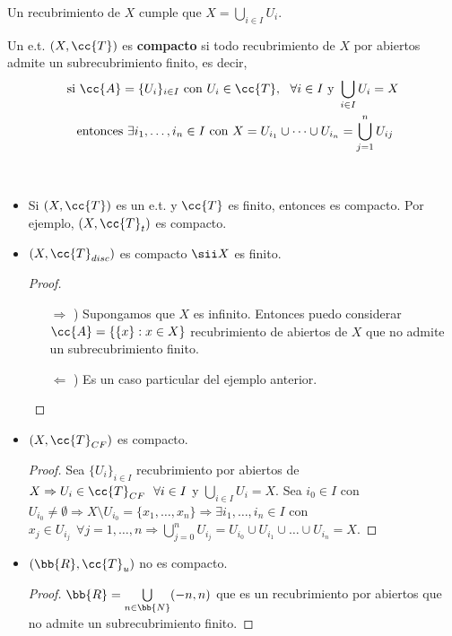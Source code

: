 \begin{observacion}
    Un recubrimiento de $X$ cumple que $X=\bigcup\limits_{i\in I}U_i$.
    \endsquare
\end{observacion}

\begin{definicion}
    Un e.t. $(X, \cc{T})$ es \textbf{compacto} si todo recubrimiento de $X$ por abiertos admite un subrecubrimiento finito, es decir,
    \begin{gather*}
        \text{si } \cc{A}=\{U_i\}_{i\in I} \text{ con } U_i\in \cc{T},\ \ \forall i \in I \text{ y } \bigcup\limits_{i\in I} U_i=X\\
        \text{ entonces } \exists i_1,\dots,i_n \in I \text{ con } X=U_{i_1}\cup \dots\cup U_{i_n}=\bigcup\limits_{j=1}^{n}U_{ij}
    \end{gather*}
    \endsquare
\end{definicion}

\begin{ejemplo}\
    \begin{itemize}
        \item Si $(X, \cc{T})$ es un e.t. y $\cc{T}$ es finito, entonces es compacto. Por ejemplo, $(X, \cc{T}_t)$ es compacto.
        \item $(X, \cc{T}_{disc})$ es compacto $\sii X$ es finito. 
        \begin{proof}\
            \begin{itemize}
                \item[$\Rightarrow$ )] Supongamos que $X$ es infinito. Entonces puedo considerar $\cc{A}=\{\{x\}:x\in X\}$ recubrimiento de abiertos de $X$ que no admite un subrecubrimiento finito.
                \item[$\Leftarrow$ )] Es un caso particular del ejemplo anterior. 
            \end{itemize}
        \end{proof}
        \item $(X, \cc{T}_{CF})$ es compacto. 
        \begin{proof}
            Sea $\{U_i\}_{i\in I}$ recubrimiento por abiertos de $X \Rightarrow U_i\in \cc{T}_{CF}\ \ \forall i \in I$ y $\bigcup\limits_{i\in I}U_i=X$. Sea $i_0\in I$ con $U_{i_0}\neq \emptyset \Rightarrow X\setminus U_{i_0}=\{x_1, \dots,x_n\} \Rightarrow \exists i_1,\dots,i_n\in I$ con $x_j\in U_{i_j}\ \ \forall j =1,\dots,n \Rightarrow \bigcup\limits_{j=0}^{n} U_{i_j}=U_{i_0}\cup U_{i_1}\cup \dots\cup U_{i_n} = X$. 

        \end{proof}
        \item $(\bb{R}, \cc{T}_u)$ no es compacto.
        \begin{proof}
            $\bb{R}=\bigcup\limits_{n\in \bb{N}}(-n,n)$ que es un recubrimiento por abiertos que no admite un subrecubrimiento finito.

        \end{proof}
    \end{itemize}
\end{ejemplo}

